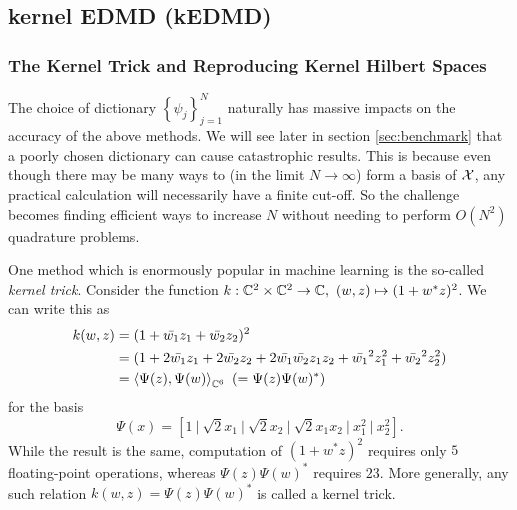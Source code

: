 \subsection{kernel EDMD (kEDMD)}


\subsubsection{The Kernel Trick and Reproducing Kernel Hilbert Spaces}

The choice of dictionary $\left\{ \psi_j \right\}_{j=1}^N$ naturally has massive impacts 
on the accuracy of the above methods. We will see later in section \ref{sec:benchmark} 
that a poorly chosen dictionary can cause catastrophic results. This is because even 
though there may be many ways to (in the limit $N \to \infty$) form a basis of $\mathcal{X}$, 
any practical calculation will necessarily have a finite cut-off. So the challenge 
becomes finding efficient ways to increase $N$ without needing to perform $O(N^2)$ 
quadrature problems. 

One method which is enormously popular in machine learning 
\cite{kernel_OG,campbell2001,hofmann2008,muller2018}
is the so-called \emph{kernel trick}. Consider the function 
$k : \mathbb{C}^2 \times \mathbb{C}^2 \to \mathbb{C},\ (w,z) \mapsto (1 + w^* z)^2$. We can write this as 
\begin{equation}
    \begin{split}
        k(w, z) &= (1 + \bar{w_1} z_1 + \bar{w_2} z_2)^2 \\
        &= (1 + 2 \bar{w_1} z_1 + 2 \bar{w_2} z_2 + 2 \bar{w_1} \bar{w_2} z_1 z_2 + \bar{w_1}^2 z_1^2 + \bar{w_2}^2 z_2^2) \\
        &= \left\langle \Psi (z), \Psi (w) \right\rangle_{\bbC^6}\ (= \Psi (z) \Psi (w)^*)
    \end{split}
\end{equation}
for the basis 
\begin{equation}
    \Psi (x) = \left[ 
        1 \ \big|\ 
        \sqrt{2} x_1 \ \big|\ 
        \sqrt{2} x_2 \ \big|\ 
        \sqrt{2} x_1 x_2 \ \big|\ 
        x_1^2 \ \big|\ x_2^2 
    \right] . 
\end{equation}
While the result is the same, computation of $(1 + w^* z)^2$ requires only $5$ 
floating-point operations, whereas $\Psi (z) \Psi (w)^*$ requires $23$. More generally, 
any such relation $k(w, z) = \Psi (z) \Psi (w)^*$ is called a kernel trick. 

